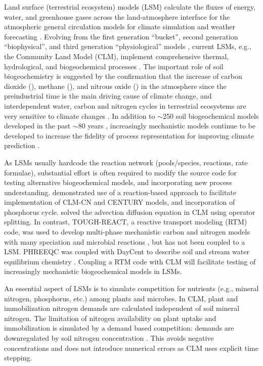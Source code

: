 \documentclass[gmd, manuscript]{copernicus}
\begin{document}
\introduction  %
Land surface (terrestrial ecosystem) models (LSM) calculate the fluxes of
energy, water, and greenhouse gases across the land-atmosphere interface for
the atmospheric general circulation models for climate simulation and weather
forecasting \citep{Sellers1997}. Evolving from the first generation ``bucket'',
second generation ``biophysical'', and third generation ``physiological''
models \citep{Seneviratne2010}, current LSMs, e.g., the Community Land Model
(CLM), implement comprehensive thermal, hydrological, and biogeochemical
processes \citep{Oleson2013}. The important role of soil biogeochemistry is
suggested by the confirmation that the increase of carbon dioxide
(), methane (), and nitrous oxide () in the
atmosphere since the preindustrial time is the main driving cause of climate
change, and interdependent water, carbon and nitrogen cycles in terrestrial
ecosystems are very sensitive to climate changes \citep{IPCC2013}. In addition
to $\sim$250 soil biogeochemical models developed in the past $\sim$80 years
\citep{Manzoni2009}, increasingly mechanistic models continue to be developed
to increase the fidelity of process representation for improving
climate prediction \citep[e.g.,][]{Riley2014}. 

As LSMs usually hardcode the reaction network (pools/species, reactions, rate
formulae), substantial effort is often required to modify the source code for
testing alternative biogeochemical models, and incorporating new process
understanding. \citet{Fang2013} demonstrated use of a reaction-based approach
to facilitate implementation of CLM-CN and CENTURY models, and incorporation of
phosphorus cycle.  \citet{Tang2013b} solved the advection diffusion equation in
CLM using operator splitting. In contrast, TOUGH-REACT, a reactive transport
modeling (RTM) code, was used to develop multi-phase mechanistic carbon and
nitrogen models with many speciation and microbial reactions
\citep{Maggi2008,Gu2010,Riley2014}, but has not been coupled to a LSM. PHREEQC
was coupled with DayCent to describe  soil and stream water equilibrium
chemistry  \citep{Hartman2007}. Coupling a RTM code with CLM will facilitate
testing of increasingly mechanistic biogeochemical models in LSMs.

An essential aspect of LSMs is to simulate competition for nutrients (e.g.,
mineral nitrogen, phosphorus, etc.) among plants and microbes. In CLM,  plant
and immobilization nitrogen demands are calculated independent of soil mineral
nitrogen. The limitation of nitrogen availability on plant uptake and
immobilization is simulated by a demand based competition: demands are
downregulated by soil nitrogen concentration \citep{Oleson2013,Thornton2005}.
This avoids negative concentrations and does not introduce numerical errors
\citep{Tang2015} as CLM uses explicit time stepping. 
\end{document}
